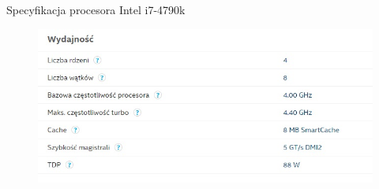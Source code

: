 \documentclass[document.tex]{subfiles}
\begin{document}
\clearpage

\Large{Specyfikacja procesora Intel i7-4790k}

\begin{figure}[h]
\includegraphics[scale=0.75]{imgs/intel_i74970k_spec.jpg}
\caption*{}
\label{fig:intel_i74970k}
\end{figure}
\end{document}

